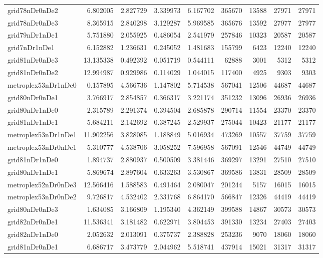 \begin{longtable}{|l|r|r|r|r|r|r|r|r|}
grid78nDr0nDe2 & 6.802005 & 2.827729 & 3.339973 & 6.167702 & 365670 & 13588 & 27971 & 27971 \\
grid78nDr0nDe3 & 8.365915 & 2.840298 & 3.129287 & 5.969585 & 365676 & 13592 & 27977 & 27977 \\
grid79nDr1nDe1 & 5.751880 & 2.055925 & 0.486054 & 2.541979 & 257846 & 10323 & 20587 & 20587 \\
grid7nDr1nDe1 & 6.152882 & 1.236631 & 0.245052 & 1.481683 & 155799 & 6423 & 12240 & 12240 \\
grid81nDr0nDe3 & 13.135338 & 0.492392 & 0.051719 & 0.544111 & 62888 & 3001 & 5312 & 5312 \\
grid81nDr0nDe2 & 12.994987 & 0.929986 & 0.114029 & 1.044015 & 117400 & 4925 & 9303 & 9303 \\
metroplex53nDr1nDe0 & 0.157895 & 4.566736 & 1.147802 & 5.714538 & 567041 & 12506 & 44687 & 44687 \\
grid80nDr0nDe1 & 3.766917 & 2.854857 & 0.366317 & 3.221174 & 351232 & 13096 & 26936 & 26936 \\
grid80nDr1nDe0 & 2.315789 & 2.291374 & 0.394504 & 2.685878 & 290714 & 11554 & 23370 & 23370 \\
grid81nDr1nDe1 & 5.684211 & 2.142692 & 0.387245 & 2.529937 & 275044 & 10423 & 21177 & 21177 \\
metroplex53nDr1nDe1 & 11.902256 & 3.828085 & 1.188849 & 5.016934 & 473269 & 10557 & 37759 & 37759 \\
metroplex53nDr0nDe1 & 5.310777 & 4.538706 & 3.058252 & 7.596958 & 567091 & 12546 & 44749 & 44749 \\
grid81nDr1nDe0 & 1.894737 & 2.880937 & 0.500509 & 3.381446 & 369297 & 13291 & 27510 & 27510 \\
grid80nDr1nDe1 & 5.869674 & 2.897604 & 0.633263 & 3.530867 & 369586 & 13831 & 28509 & 28509 \\
metroplex52nDr0nDe3 & 12.566416 & 1.588583 & 0.491464 & 2.080047 & 201244 & 5157 & 16015 & 16015 \\
metroplex53nDr0nDe2 & 9.726817 & 4.532402 & 2.331768 & 6.864170 & 566847 & 12326 & 44419 & 44419 \\
grid80nDr0nDe3 & 1.634085 & 3.166809 & 1.195340 & 4.362149 & 399588 & 14867 & 30573 & 30573 \\
grid82nDr0nDe1 & 11.536341 & 3.181482 & 0.622971 & 3.804453 & 391330 & 13234 & 27403 & 27403 \\
grid82nDr1nDe0 & 2.052632 & 2.013091 & 0.375737 & 2.388828 & 253236 & 9070 & 18060 & 18060 \\
grid81nDr0nDe1 & 6.686717 & 3.473779 & 2.044962 & 5.518741 & 437914 & 15021 & 31317 & 31317 \\

\end{longtable}
